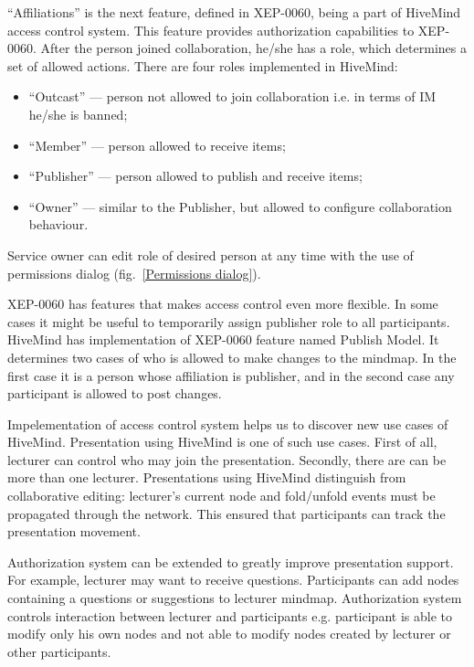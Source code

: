 ``Affiliations'' is the next feature, defined in XEP-0060, being a part of
HiveMind access control system. This feature provides authorization capabilities
to XEP-0060. After the person joined collaboration, he/she has a role, which
determines a set of allowed actions. There are four roles implemented in
HiveMind:
\begin{itemize}
\item ``Outcast'' --- person not allowed to join collaboration i.e. in terms of
  IM he/she is banned;
\item ``Member'' --- person allowed to receive items;
\item ``Publisher'' --- person allowed to publish and receive items;
\item ``Owner'' --- similar to the Publisher, but allowed to configure
  collaboration behaviour.
\end{itemize}
Service owner can edit role of desired person at any time with the use of
permissions dialog (fig.~\ref{Permissions dialog}).

XEP-0060 has features that makes access control even more flexible. In some
cases it might be useful to temporarily assign publisher role to all
participants. HiveMind has implementation of XEP-0060 feature named Publish
Model. It determines two cases of who is allowed to make changes to the
mindmap. In the first case it is a person whose affiliation is publisher, and in
the second case any participant is allowed to post changes.

Impelementation of access control system helps us to discover new use cases of
HiveMind. Presentation using HiveMind is one of such use cases. First of all,
lecturer can control who may join the presentation. Secondly, there are can be
more than one lecturer. Presentations using HiveMind distinguish from
collaborative editing: lecturer's current node and fold/unfold events must be
propagated through the network. This ensured that participants can track the
presentation movement.
 
Authorization system can be extended to greatly improve presentation
support. For example, lecturer may want to receive questions. Participants
can add nodes containing a questions or suggestions to lecturer mindmap.
Authorization system controls interaction between lecturer and participants e.g.
participant is able to modify only his own nodes and not able to modify nodes
created by lecturer or other participants.
